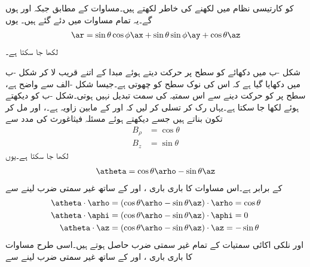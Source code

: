  کو کارتیسی نظام میں لکھنے کی خاطر  لکھتے ہیں۔مساوات  کے مطابق  جبکہ  اور  ہوں گے۔یہ تمام  مساوات  میں دئے گئے ہیں۔ یوں 
\begin{align}
\ar=\sin \theta \cos \phi \ax+\sin \theta \sin \phi \ay+\cos \theta \az
\end{align}
لکھا جا سکتا ہے۔

شکل -ب میں دکھائے  کو  سطح پر حرکت دیتے ہوئے  مبدا کے اتنے قریب لا کر شکل -ب میں دکھایا گیا ہے کہ اس کی نوک  سطح کو چھوتی ہے۔جیسا شکل -الف سے واضح ہے،   سطح پر  کو حرکت دینے سے اس سمتیہ کی سمت تبدیل نہیں ہوتی۔شکل -ب کو دیکھتے ہوئے  لکھا جا سکتا ہے۔یہاں رک کر  تسلی کر لیں کہ  اور  کے مابین زاویہ  ہے۔،  اور  مل کر تکون بناتے ہیں جسے دیکھتے ہوئے مسئلہ فیثاغورث کی مدد سے
\begin{align*}
B_\rho&=\cos \theta\\
B_z&=\sin \theta
\end{align*}
لکھا جا سکتا ہے۔یوں
\begin{align}\label{مساوات_سمتیہ_کروی_اکائی_تھیٹا}
\atheta=\cos \theta \arho-\sin \theta \az
\end{align}
کے برابر ہے۔اس مساوات کا باری باری ،  اور  کے ساتھ غیر سمتی ضرب لینے سے
\begin{gather}
\begin{aligned}\label{مساوات_سمتیہ_کروی_تھیٹا_نلکی_اکائی_غیر_سمتی_ضرب}
\atheta \cdot \arho&=(\cos \theta \arho-\sin \theta \az) \cdot \arho=\cos \theta\\
\atheta \cdot \aphi&=(\cos \theta \arho-\sin \theta \az) \cdot \aphi=0\\
\atheta \cdot \az&=(\cos \theta \arho-\sin \theta \az) \cdot \az=-\sin \theta
\end{aligned}
\end{gather}
 اور نلکی اکائی سمتیات کے  تمام غیر سمتی ضرب حاصل ہوتے ہیں۔اسی طرح مساوات  کا باری باری ،  اور  کے ساتھ غیر سمتی ضرب لینے سے

